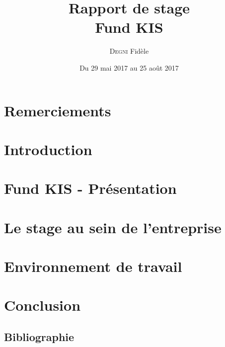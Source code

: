\documentclass[12pt]{article}
\author{\textsc{Degni} Fidèle}
\date{Du 29 mai 2017 au 25 août 2017}
\title{Rapport de stage \\ Fund KIS}
\begin{document}
\maketitle
\thispagestyle{empty}

\newpage
\setcounter{page}{1} %
\renewcommand{\contentsname}{Sommaire} %
\tableofcontents
\renewcommand{\thepage}{\arabic{page}}

\newpage
\section*{Remerciements}



\newpage
\section*{Introduction} %



\newpage
\section{Fund KIS - Présentation}



\vspace{1.5cm}
\section{Le stage au sein de l'entreprise}



\vspace{1.5cm}
\section{Environnement de travail}



\newpage
\section*{Conclusion}



\newpage
\subsection*{Bibliographie}
\end{document}
